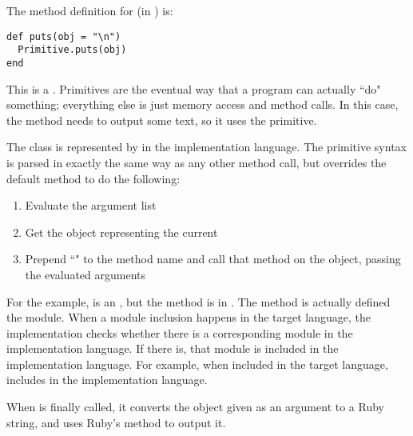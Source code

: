 The method definition for  (in ) is:

\begin{lstlisting}
def puts(obj = "\n")
  Primitive.puts(obj)
end
\end{lstlisting}

This is a . Primitives are the eventual way that a program can actually ``do" something; everything else is just memory access and method calls. In this case, the  method needs to output some text, so it uses the  primitive.

The  class is represented by  in the implementation language. The primitive syntax is parsed in exactly the same way as any other method call, but  overrides the default  method to do the following:

\begin{enumerate}
  \item Evaluate the argument list
  \item Get the object representing the current 
  \item Prepend ``" to the method name and call that method on the object, passing the evaluated arguments
\end{enumerate}

For the example,  is an , but the method is in . The  method is actually defined the  module. When a module inclusion happens in the target language, the implementation checks whether there is a corresponding module in the implementation language. If there is, that module is included in the implementation language. For example, when  included  in the target language,  includes  in the implementation language.

When  is finally called, it converts the object given as an argument to a Ruby string, and uses Ruby's  method to output it.
